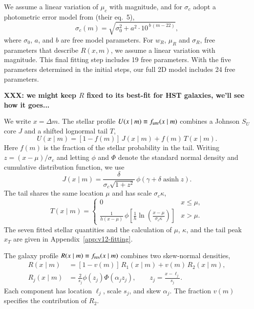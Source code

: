 We assume a linear variation of $\mu_c$ with magnitude, and for
$\sigma_c$ adopt a photometric error model from \citet{2007AJ....134.2236S} (their eq.~5),
\begin{equation}
            \sigma_c(m) = \sqrt{\sigma_0^2 + a^2 \cdot 10^{\,b\,(m - 22)}},
  \label{eq:sesar_sigma}
\end{equation}
where \(\sigma_0\), \(a\), and \(b\) are free model parameters. For $w_R$,  $\mu_R$ and $\sigma_R$,
free parameters that describe $R(x,m)$, we assume a linear variation with magnitude. This final
fitting step includes 19 free parameters. With the five parameters determined in the initial steps,
our full 2D model includes 24 free parameters.
      
{\bf XXX: we might keep $R$ fixed to its best-fit for HST galaxies, we'll see how it goes...}




We write \(x=\Delta m\). The stellar profile \(U(x\mid m)\equiv f_{\rm unr}(x\mid m)\)
combines a Johnson \(S_U\) core \(J\) and a shifted lognormal tail \(T\),
\begin{equation}
 U(x\mid m)=[1-f(m)]\,J(x\mid m)+f(m)\,T(x\mid m).
 \label{eq:mixpdf2}
\end{equation}
Here \(f(m)\) is the fraction of the stellar probability in the tail.
Writing \(z=(x-\mu)/\sigma_c\) and letting \(\phi\) and \(\Phi\) denote
the standard normal density and cumulative distribution function, we use
\begin{equation}
 J(x\mid m)=\frac{\delta}{\sigma_c\sqrt{1+z^2}}\,
       \phi\!\left(\gamma+\delta\operatorname{asinh}z\right).
\end{equation}
The tail shares the same location \(\mu\) and has scale \(\sigma_c\kappa\),
\begin{equation}
 T(x\mid m)=
 \begin{cases}
 0 & x\leq\mu,\\[.2em]
 \displaystyle\frac{1}{h(x-\mu)}\,
    \phi\!\left[\frac{1}{h}\ln\!\left(\frac{x-\mu}{\sigma_c\kappa}\right)\right]
     & x>\mu.
 \end{cases}
 \label{eq:mixpd4}
\end{equation}
The seven fitted stellar quantities and the calculation of \(\mu\),
\(\kappa\), and the tail peak \(x_T\) are given in Appendix~\ref{app:v12-fitting}.

The galaxy profile \(R(x\mid m)\equiv f_{\rm res}(x\mid m)\) combines two
skew-normal densities,
\begin{equation}
 \begin{aligned}
 R(x\mid m)&=[1-v(m)]\,R_1(x\mid m)+v(m)\,R_2(x\mid m),\\
 R_j(x\mid m)&=\frac{2}{s_j}\phi(z_j)\Phi(\alpha_jz_j),\qquad
 z_j=\frac{x-\ell_j}{s_j}.
 \end{aligned}
 \label{eq:mixpd5}
\end{equation}
Each component has location \(\ell_j\), scale \(s_j\), and skew
\(\alpha_j\). The fraction \(v(m)\) specifies the contribution of \(R_2\).

